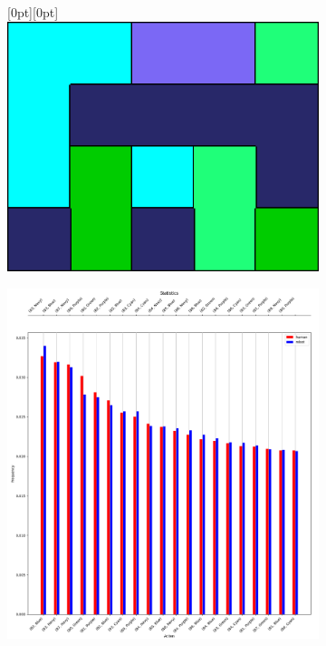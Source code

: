         \begin{figure}[H]
            \centering
            \begin{subfigure}[b]{0.45\textwidth}
                \centering
                \vspace{0.5em}
                \raisebox{0.8cm}[0pt][0pt]{\includegraphics[width=\textwidth]{images/cc-solution.png}}
                \caption{}
                \label{fig:cc-solution}
            \end{subfigure}
            \hspace{0.05\textwidth}
            \begin{subfigure}[b]{0.45\textwidth}
                \centering
                \includegraphics[width=\textwidth]{images/cc-stats.png}

\end{subfigure}
\end{figure}
